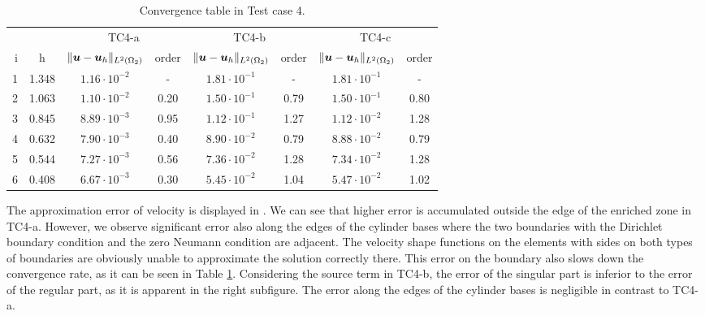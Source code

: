 \begin{table}[!htb]
\begin{center}
\bgroup
\def\arraystretch{1.2}
\setlength\tabcolsep{5pt}
\begin{tabular}{rc|cc|cc|cc}
\toprule
\multicolumn{2}{c|}{} & \multicolumn{2}{c|}{ TC4-a } & \multicolumn{2}{c|}{ TC4-b } & \multicolumn{2}{c}{TC4-c}\\ [3pt] %
i & h & $\|\mathbf{\boldsymbol{u}}-\mathbf{\boldsymbol{u}}_h\|_{L^2(\Omega_2)}$ & order & $\|\mathbf{\boldsymbol{u}}-\mathbf{\boldsymbol{u}}_h\|_{L^2(\Omega_2)}$
    & order & $\|\mathbf{\boldsymbol{u}}-\mathbf{\boldsymbol{u}}_h\|_{L^2(\Omega_2)}$ & order \\ [3pt] \midrule
1 & 1.348 &  $1.16\cdot10^{-2}$  &  -   &  $1.81\cdot10^{-1}$  &  -   &  $1.81\cdot10^{-1}$ &   -   \\
2 & 1.063 &  $1.10\cdot10^{-2}$  & 0.20 &  $1.50\cdot10^{-1}$  & 0.79 &  $1.50\cdot10^{-1}$ &  0.80 \\
3 & 0.845 &  $8.89\cdot10^{-3}$  & 0.95 &  $1.12\cdot10^{-1}$  & 1.27 &  $1.12\cdot10^{-2}$ &  1.28 \\
4 & 0.632 &  $7.90\cdot10^{-3}$  & 0.40 &  $8.90\cdot10^{-2}$  & 0.79 &  $8.88\cdot10^{-2}$ &  0.79 \\
5 & 0.544 &  $7.27\cdot10^{-3}$  & 0.56 &  $7.36\cdot10^{-2}$  & 1.28 &  $7.34\cdot10^{-2}$ &  1.28 \\
6 & 0.408 &  $6.67\cdot10^{-3}$  & 0.30 &  $5.45\cdot10^{-2}$  & 1.04 &  $5.47\cdot10^{-2}$ &  1.02 \\
\bottomrule
\end{tabular}
\caption{Convergence table in Test case 4.}
\label{tab:mh_tc4_convergence}
\egroup
\end{center}
\end{table}

The approximation error of velocity is displayed in . We can see that higher
error is accumulated outside the edge of the enriched zone in TC4-a. However, we observe significant error also
along the edges of the cylinder bases where the two boundaries with the Dirichlet boundary condition and the zero Neumann condition
are adjacent. The velocity shape functions on the elements with sides on both types of boundaries are obviously unable to approximate
the solution correctly there. This error on the boundary also slows down the convergence rate, as it can be seen in Table \ref{tab:mh_tc4_convergence}.
Considering the source term in TC4-b, the error of the singular part is inferior to the error of the regular part, as it is apparent
in the right subfigure. The error along the edges of the cylinder bases is negligible in contrast to TC4-a.



